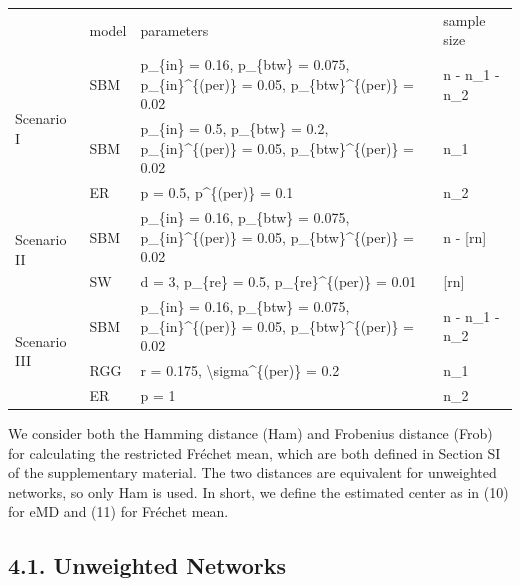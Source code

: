 \documentclass[
  10
]{article}
\newcounter{none} %
\begin{document}
{\def\LTcaptype{none} %
\begin{longtable}[]{@{}llll@{}}
\toprule\noalign{}
\endhead
\bottomrule\noalign{}
\endlastfoot
& model & parameters & sample size \\
\multirow{3}{*}{Scenario I} & SBM & p\_\{in\} = 0.16, p\_\{btw\} =
0.075, p\_\{in\}\^{}\{(per)\} = 0.05, p\_\{btw\}\^{}\{(per)\} = 0.02 & n
- n\_1 - n\_2 \\
& SBM & p\_\{in\} = 0.5, p\_\{btw\} = 0.2, p\_\{in\}\^{}\{(per)\} =
0.05, p\_\{btw\}\^{}\{(per)\} = 0.02 & n\_1 \\
& ER & p = 0.5, p\^{}\{(per)\} = 0.1 & n\_2 \\
\multirow{2}{*}{Scenario II} & SBM & p\_\{in\} = 0.16, p\_\{btw\} =
0.075, p\_\{in\}\^{}\{(per)\} = 0.05, p\_\{btw\}\^{}\{(per)\} = 0.02 & n
- {[}rn{]} \\
& SW & d = 3, p\_\{re\} = 0.5, p\_\{re\}\^{}\{(per)\} = 0.01 &
{[}rn{]} \\
\multirow{3}{*}{Scenario III} & SBM & p\_\{in\} = 0.16, p\_\{btw\} =
0.075, p\_\{in\}\^{}\{(per)\} = 0.05, p\_\{btw\}\^{}\{(per)\} = 0.02 & n
- n\_1 - n\_2 \\
& RGG & r = 0.175, \textbackslash sigma\^{}\{(per)\} = 0.2 & n\_1 \\
& ER & p = 1 & n\_2 \\
\end{longtable}
}

We consider both the Hamming distance (Ham) and Frobenius distance
(Frob) for calculating the restricted Fréchet mean, which are both
defined in Section SI of the supplementary material. The two distances
are equivalent for unweighted networks, so only Ham is used. In short,
we define the estimated center as in (10) for eMD and (11) for Fréchet
mean.

\subsection{4.1. Unweighted Networks}\label{unweighted-networks}
\end{document}
